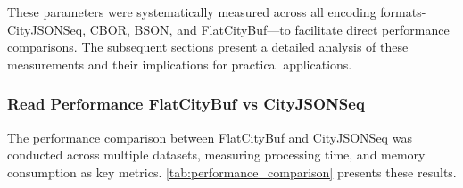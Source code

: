 These parameters were systematically measured across all encoding formats-CityJSONSeq, CBOR, BSON, and FlatCityBuf—to facilitate direct performance comparisons.  The subsequent sections present a detailed analysis of these measurements and their implications for practical applications.

\subsubsection{Read Performance FlatCityBuf vs CityJSONSeq}
\label{result:benchmark_on_local_environment:read_performance_flatcitybuf_vs_cityjsonseq}

The performance comparison between FlatCityBuf and CityJSONSeq was conducted across multiple datasets, measuring processing time, and memory consumption as key metrics. \autoref{tab:performance_comparison} presents these results.

